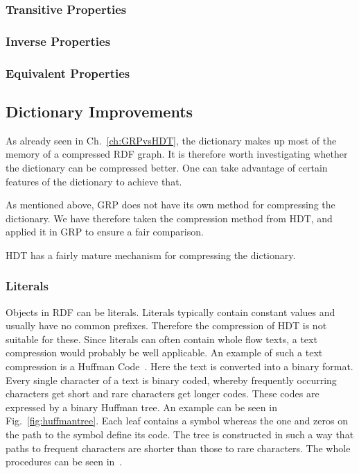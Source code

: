 

\subsubsection{Transitive Properties}

\subsubsection{Inverse Properties}

\subsubsection{Equivalent Properties}


\subsection{Dictionary Improvements}\label{sec:approachDictImprovements}


As already seen in Ch.~\ref{ch:GRPvsHDT}, the dictionary makes up most of the memory of a compressed RDF graph. It is therefore worth investigating whether the dictionary can be compressed better. One can take advantage of certain features of the dictionary to achieve that.

As mentioned above, GRP does not have its own method for compressing the dictionary. We have therefore taken the compression method from HDT, and applied it in GRP to ensure a fair comparison.

HDT has a fairly mature mechanism for compressing the dictionary.

\subsubsection{Literals}\label{sec:approachLiterals}

Objects in RDF can be literals. Literals typically contain constant values and usually have no common prefixes. Therefore the compression of HDT is not suitable for these. Since literals can often contain whole flow texts, a text compression would probably be well applicable. An example of such a text compression is a Huffman Code~\cite{huffman}. Here the text is converted into a binary format. Every single character of a text is binary coded, whereby frequently occurring characters get short and rare characters get longer codes. These codes are expressed by a binary Huffman tree. An example can be seen in Fig.~\ref{fig:huffmantree}. Each leaf contains a symbol whereas the one and zeros on the path to the symbol define its code. The tree is constructed in such a way that paths to frequent characters are shorter than those to rare characters. The whole procedures can be seen in~\cite{huffman}.

